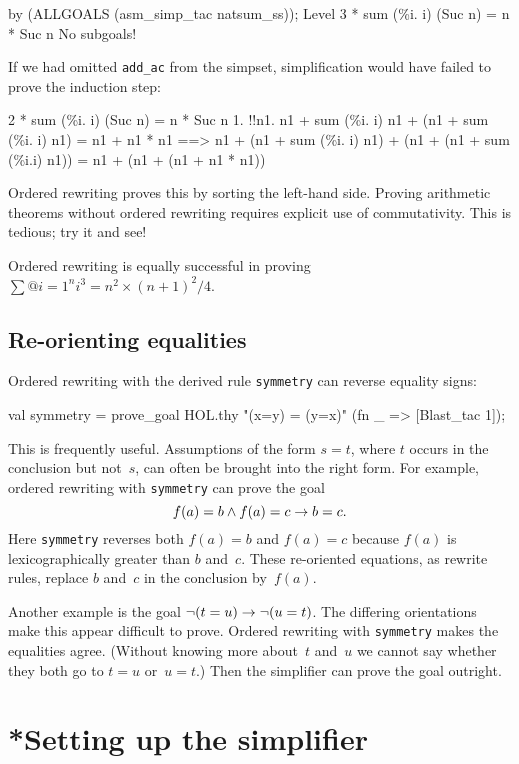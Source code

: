 \begin{ttbox}
by (ALLGOALS (asm_simp_tac natsum_ss));
{\out Level 3}
{ * sum (\%i. i) (Suc n) = n * Suc n}
{\out No subgoals!}
\end{ttbox}
If we had omitted {\tt add_ac} from the simpset, simplification would have
failed to prove the induction step:
\begin{ttbox}
2 * sum (\%i. i) (Suc n) = n * Suc n
 1. !!n1. n1 + sum (\%i. i) n1 + (n1 + sum (\%i. i) n1) = n1 + n1 * n1
          ==> n1 + (n1 + sum (\%i. i) n1) + (n1 + (n1 + sum (\%i.i) n1)) =
              n1 + (n1 + (n1 + n1 * n1))
\end{ttbox}
Ordered rewriting proves this by sorting the left-hand side.  Proving
arithmetic theorems without ordered rewriting requires explicit use of
commutativity.  This is tedious; try it and see!

Ordered rewriting is equally successful in proving
$\sum@{i=1}^n i^3 = n^2\times(n+1)^2/4$.


\subsection{Re-orienting equalities}
Ordered rewriting with the derived rule {\tt symmetry} can reverse equality
signs:
\begin{ttbox}
val symmetry = prove_goal HOL.thy "(x=y) = (y=x)"
                 (fn _ => [Blast_tac 1]);
\end{ttbox}
This is frequently useful.  Assumptions of the form $s=t$, where $t$ occurs
in the conclusion but not~$s$, can often be brought into the right form.
For example, ordered rewriting with {\tt symmetry} can prove the goal
\[ f(a)=b \wedge f(a)=c \rightarrow b=c. \]
Here {\tt symmetry} reverses both $f(a)=b$ and $f(a)=c$
because $f(a)$ is lexicographically greater than $b$ and~$c$.  These
re-oriented equations, as rewrite rules, replace $b$ and~$c$ in the
conclusion by~$f(a)$. 

Another example is the goal $\neg(t=u) \rightarrow \neg(u=t)$.
The differing orientations make this appear difficult to prove.  Ordered
rewriting with {\tt symmetry} makes the equalities agree.  (Without
knowing more about~$t$ and~$u$ we cannot say whether they both go to $t=u$
or~$u=t$.)  Then the simplifier can prove the goal outright.



\section{*Setting up the simplifier}\label{sec:setting-up-simp}

